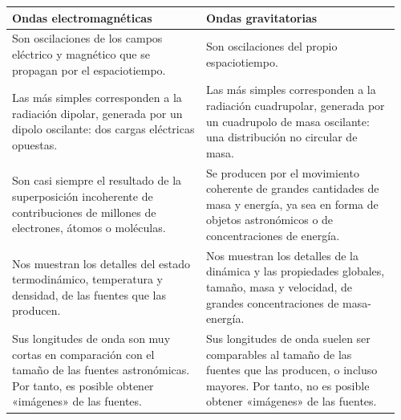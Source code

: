 {\small
\setlength{\tabcolsep}{5pt}
\begin{longtable}{@{}>{\raggedright\arraybackslash}p{0.48\linewidth}>{\raggedright\arraybackslash}p{0.48\linewidth}@{}}
\toprule
\textbf{Ondas electromagnéticas}
&
\textbf{Ondas gravitatorias}
\\[6pt]
\midrule
Son oscilaciones de los campos eléctrico y magnético que se propagan por el espaciotiempo.
&
Son oscilaciones del propio espaciotiempo.
\\[6pt]
Las más simples corresponden a la radiación\index{dipolo!radiación} dipolar, generada por un dipolo\index{dipolo!eléctrico} oscilante: dos cargas eléctricas opuestas.
&
Las más simples corresponden a la radiación\index{cuadrupolo!radiación} cuadrupolar, generada por un cuadrupolo de masa\index{cuadrupolo!masa} oscilante: una distribución no circular de masa.
\\[6pt]
Son casi siempre el resultado de la superposición incoherente de contribuciones de millones de electrones, átomos o moléculas.
&
Se producen por el movimiento coherente de grandes cantidades de masa y energía, ya sea en forma de objetos astronómicos o de concentraciones de energía.
\\[6pt]
Nos muestran los detalles del estado termodinámico\index{estado termodinámico}, temperatura y densidad, de las fuentes que las producen.
&
Nos muestran los detalles de la dinámica y las propiedades globales, tamaño, masa y velocidad, de grandes concentraciones de masa-energía.
\\[6pt]
Sus longitudes de onda son muy cortas en comparación con el tamaño de las fuentes astronómicas. Por tanto, es posible obtener «imágenes» de las fuentes.
&
Sus longitudes de onda suelen ser comparables al tamaño de las fuentes que las producen, o incluso mayores. Por tanto, no es posible obtener «imágenes» de las fuentes.
\\[6pt]

\end{longtable}}
